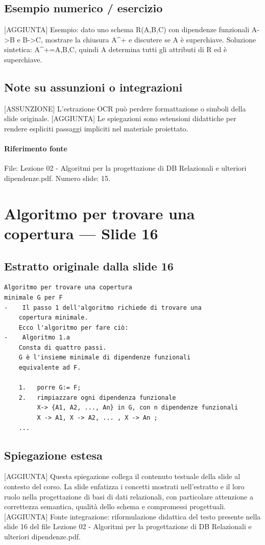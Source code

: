 \documentclass[11pt]{article}
\begin{document}
\subsection*{Esempio numerico / esercizio}
[AGGIUNTA] Esempio: dato uno schema R(A,B,C) con dipendenze funzionali A->B e B->C, mostrare la chiusura A^+ e discutere se A è superchiave. Soluzione sintetica: A^+={A,B,C}, quindi A determina tutti gli attributi di R ed è superchiave.
\subsection*{Note su assunzioni o integrazioni}
[ASSUNZIONE] L'estrazione OCR può perdere formattazione o simboli della slide originale.
[AGGIUNTA] Le spiegazioni sono estensioni didattiche per rendere espliciti passaggi impliciti nel materiale proiettato.
\paragraph{Riferimento fonte} File: Lezione 02 - Algoritmi per la progettazione di DB Relazionali e ulteriori dipendenze.pdf. Numero slide: 15.
\section{Algoritmo per trovare una copertura --- Slide 16}
\subsection*{Estratto originale dalla slide 16}
\begin{lstlisting}
Algoritmo per trovare una copertura
minimale G per F
-    Il passo 1 dell'algoritmo richiede di trovare una
    copertura minimale.
    Ecco l'algoritmo per fare ciò:
-    Algoritmo 1.a
    Consta di quattro passi.
    G è l'insieme minimale di dipendenze funzionali
    equivalente ad F.

    1.   porre G:= F;
    2.   rimpiazzare ogni dipendenza funzionale
         X-> {A1, A2, ..., An} in G, con n dipendenze funzionali
         X -> A1, X -> A2, ... , X -> An ;
    ...
\end{lstlisting}
\subsection*{Spiegazione estesa}
[AGGIUNTA] Questa spiegazione collega il contenuto testuale della slide al contesto del corso. La slide enfatizza i concetti mostrati nell'estratto e il loro ruolo nella progettazione di basi di dati relazionali, con particolare attenzione a correttezza semantica, qualità dello schema e compromessi progettuali.
[AGGIUNTA] Fonte integrazione: riformulazione didattica del testo presente nella slide 16 del file Lezione 02 - Algoritmi per la progettazione di DB Relazionali e ulteriori dipendenze.pdf.
\end{document}
